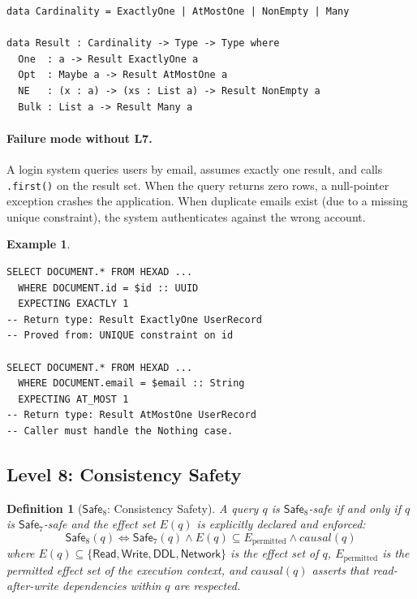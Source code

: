 \documentclass[11pt,a4paper]{article}
\newtheorem{definition}[theorem]{Definition}
\newtheorem{example}[theorem]{Example}
\newcommand{\LevelN}[1]{\textsf{L#1}}
\newcommand{\Safe}[1]{\ensuremath{\mathsf{Safe}_{#1}}}
\begin{document}
\begin{lstlisting}[language=Idris2]
data Cardinality = ExactlyOne | AtMostOne | NonEmpty | Many

data Result : Cardinality -> Type -> Type where
  One  : a -> Result ExactlyOne a
  Opt  : Maybe a -> Result AtMostOne a
  NE   : (x : a) -> (xs : List a) -> Result NonEmpty a
  Bulk : List a -> Result Many a
\end{lstlisting}

\paragraph{Failure mode without \LevelN{7}.}
A login system queries users by email, assumes exactly one result, and
calls \texttt{.first()} on the result set.  When the query returns zero
rows, a null-pointer exception crashes the application.  When duplicate
emails exist (due to a missing unique constraint), the system
authenticates against the wrong account.

\begin{example}
\begin{lstlisting}[language=VCL]
SELECT DOCUMENT.* FROM HEXAD ...
  WHERE DOCUMENT.id = $id :: UUID
  EXPECTING EXACTLY 1
-- Return type: Result ExactlyOne UserRecord
-- Proved from: UNIQUE constraint on id

SELECT DOCUMENT.* FROM HEXAD ...
  WHERE DOCUMENT.email = $email :: String
  EXPECTING AT_MOST 1
-- Return type: Result AtMostOne UserRecord
-- Caller must handle the Nothing case.
\end{lstlisting}
\end{example}

\subsection{Level 8: Consistency Safety}\label{sec:L8}

\begin{definition}[\Safe{8}: Consistency Safety]
A query $q$ is \Safe{8}-safe if and only if $q$ is \Safe{7}-safe and
the effect set $E(q)$ is explicitly declared and enforced:
\[
  \Safe{8}(q) \iff \Safe{7}(q) \land
  E(q) \subseteq E_{\text{permitted}} \land
  \mathit{causal}(q)
\]
where $E(q) \subseteq \{\mathsf{Read}, \mathsf{Write}, \mathsf{DDL},
\mathsf{Network}\}$ is the effect set of $q$,
$E_{\text{permitted}}$ is the permitted effect set of the execution
context, and $\mathit{causal}(q)$ asserts that read-after-write
dependencies within $q$ are respected.
\end{definition}
\end{document}
